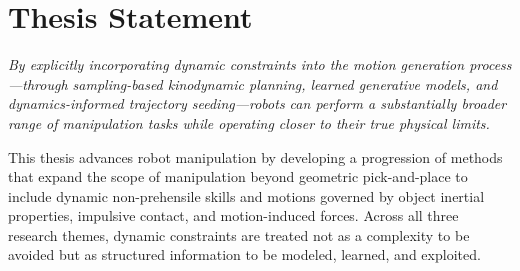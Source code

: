 \section{Thesis Statement}
\label{sec:intro:statement}

\textit{By explicitly incorporating dynamic constraints into the motion generation process---through sampling-based kinodynamic planning, learned generative models, and dynamics-informed trajectory seeding---robots can perform a substantially broader range of manipulation tasks while operating closer to their true physical limits.}

This thesis advances robot manipulation by developing a progression of methods that expand the scope of manipulation beyond geometric pick-and-place to include dynamic non-prehensile skills and motions governed by object inertial properties, impulsive contact, and motion-induced forces.
Across all three research themes, dynamic constraints are treated not as a complexity to be avoided but as structured information to be modeled, learned, and exploited.
